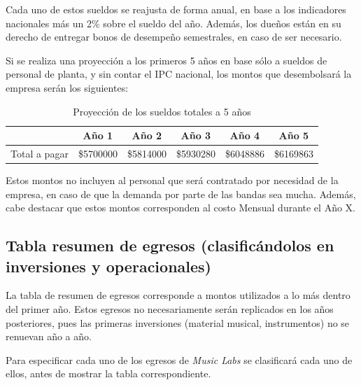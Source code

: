 Cada uno de estos sueldos se reajusta de forma anual, en base a los indicadores nacionales más un 2\% sobre el sueldo del año.
Además, los dueños están en su derecho de entregar bonos de desempeño semestrales, en caso de ser necesario.

Si se realiza una proyección a los primeros 5 años en base sólo a sueldos de personal de planta, y sin contar el IPC
nacional, los montos que desembolsará la empresa serán los siguientes:

\begin{table}[h]
\centering
\begin{tabular}{|c|c|c|c|c|c|} \hline
              & Año 1     & Año 2     & Año 3     & Año 4     & Año 5     \\ \hline
Total a pagar & \$5700000 & \$5814000 & \$5930280 & \$6048886 & \$6169863 \\ \hline
\end{tabular}
\caption{Proyección de los sueldos totales a 5 años}
\end{table} 

Estos montos no incluyen al personal que será contratado por necesidad de la empresa, en caso
de que la demanda por parte de las bandas sea mucha. Además, cabe destacar que estos montos corresponden 
al costo Mensual durante el Año X.
\subsection{Tabla resumen de egresos (clasificándolos en inversiones y operacionales)}

La tabla de resumen de egresos corresponde a montos utilizados a lo más dentro del primer año. 
Estos egresos no necesariamente serán replicados en los años posteriores, pues las primeras inversiones
(material musical, instrumentos) no se renuevan año a año.

Para especificar cada uno de los egresos de \emph{Music Labs} se clasificará cada uno de ellos, antes de
mostrar la tabla correspondiente. 


